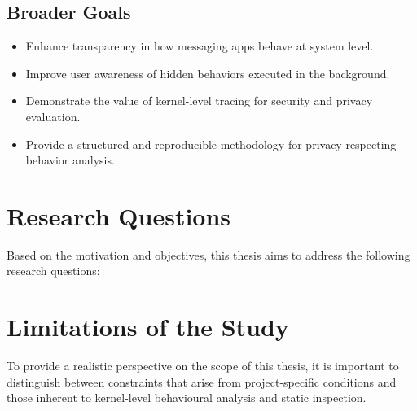 \documentclass[a4paper,12pt]{report}
\begin{document}
\subsection*{Broader Goals}
\begin{itemize}
\item Enhance transparency in how messaging apps behave at system level.
\item Improve user awareness of hidden behaviors executed in the background.
\item Demonstrate the value of kernel-level tracing for security and privacy evaluation.
\item Provide a structured and reproducible methodology for privacy-respecting
behavior analysis.
\end{itemize}

\section{Research Questions}
Based on the motivation and objectives, this thesis aims to address the following
research questions:

\vspace{0.5em}
\noindent{}

\vspace{0.5em}
\noindent{}

\vspace{0.5em}
\noindent{}

\vspace{0.5em}
\noindent{}

\section{Limitations of the Study}

To provide a realistic perspective on the scope of this thesis, it is important to distinguish between constraints that arise from project-specific conditions and those inherent to kernel-level behavioural analysis and static inspection.
\end{document}
